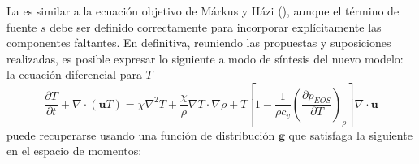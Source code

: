 La  es similar a la ecuaci\'on objetivo de M\'arkus y H\'azi (), aunque el t\'ermino de fuente $s$ debe ser definido correctamente para incorporar expl\'icitamente las componentes faltantes. En definitiva, reuniendo las propuestas y suposiciones realizadas, es posible expresar lo siguiente a modo de s\'intesis del nuevo modelo: la ecuaci\'on diferencial para $T$
\begin{equation}
	\dfrac{\partial T}{\partial t} + \nabla \cdot (\bm{u} T) = \chi \nabla^2 T  + \dfrac{\chi}{\rho} \nabla T \cdot \nabla \rho + T \left[ 1 - \dfrac{1}{\rho c_v} \left( \dfrac{\partial p_{EOS}}{\partial T} \right)_{\rho} \right] \nabla \cdot \bm{u}
\end{equation}
puede recuperarse usando una funci\'on de distribuci\'on $\bm{g}$ que satisfaga la siguiente \lbe{} en el espacio de momentos:
